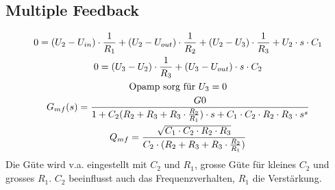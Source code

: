 \subsection{Multiple Feedback}
\begin{figure}[!h]
	\begin{center}
		 \qquad
	\end{center} 
\end{figure}
\begin{gather}
0=(U_2-U_{in})\cdot \frac{1}{R_1}+(U_2-U_{out})\cdot \frac{1}{R_2}+(U_2-U_3)\cdot \frac{1}{R_3}+U_2\cdot s\cdot C_1\\
0=(U_3-U_2)\cdot \frac{1}{R_3}+(U_3-U_{out})\cdot s\cdot C_2\\
\text{Opamp sorg für }U_3=0\notag\\
G_{mf}(s)=\frac{G0}{1+C_2(R_2+R_3+R_3\cdot \frac{R_2}{R_1})\cdot s+C_1\cdot C_2\cdot R_2\cdot R_3\cdot s^s}\\
Q_{mf}=\frac{\sqrt{C_1\cdot C_2\cdot R_2\cdot R_3}}{C_2\cdot (R_2+R_3+R_3\cdot \frac{R_2}{R_1})}
\end{gather}
Die Güte wird v.a. eingestellt mit $C_2$ und $R_1$, grosse Güte für kleines
$C_2$ und grosses $R_1$. $C_2$ beeinflusst auch das Frequenzverhalten, $R_1$ die
Verstärkung.

